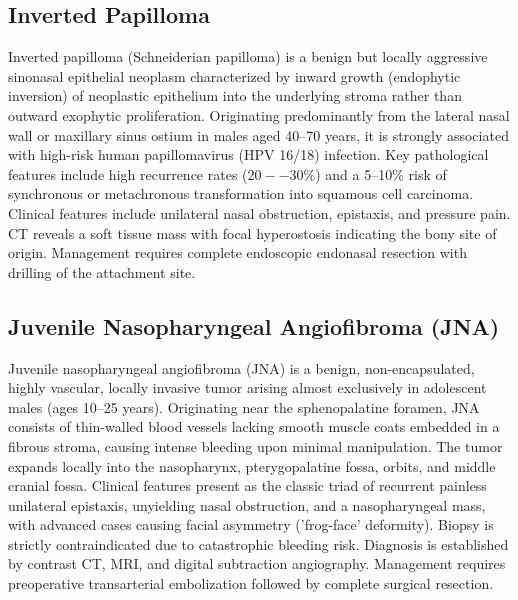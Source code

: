 \subsection{Inverted Papilloma}
\label{sec:Inverted Papilloma}
Inverted papilloma (Schneiderian papilloma) is a benign but locally aggressive sinonasal epithelial neoplasm characterized by inward growth (endophytic inversion) of neoplastic epithelium into the underlying stroma rather than outward exophytic proliferation. Originating predominantly from the lateral nasal wall or maxillary sinus ostium in males aged 40--70 years, it is strongly associated with high-risk human papillomavirus (HPV 16/18) infection. Key pathological features include high recurrence rates ($20--30\%$) and a 5--10\% risk of synchronous or metachronous transformation into squamous cell carcinoma. Clinical features include unilateral nasal obstruction, epistaxis, and pressure pain. CT reveals a soft tissue mass with focal hyperostosis indicating the bony site of origin. Management requires complete endoscopic endonasal resection with drilling of the attachment site.

\subsection{Juvenile Nasopharyngeal Angiofibroma (JNA)}
\label{sec:Juvenile Nasopharyngeal Angiofibroma (JNA)}
Juvenile nasopharyngeal angiofibroma (JNA) is a benign, non-encapsulated, highly vascular, locally invasive tumor arising almost exclusively in adolescent males (ages 10--25 years). Originating near the sphenopalatine foramen, JNA consists of thin-walled blood vessels lacking smooth muscle coats embedded in a fibrous stroma, causing intense bleeding upon minimal manipulation. The tumor expands locally into the nasopharynx, pterygopalatine fossa, orbits, and middle cranial fossa. Clinical features present as the classic triad of recurrent painless unilateral epistaxis, unyielding nasal obstruction, and a nasopharyngeal mass, with advanced cases causing facial asymmetry ('frog-face' deformity). Biopsy is strictly contraindicated due to catastrophic bleeding risk. Diagnosis is established by contrast CT, MRI, and digital subtraction angiography. Management requires preoperative transarterial embolization followed by complete surgical resection.


